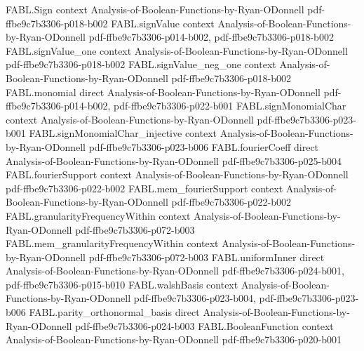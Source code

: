 \begin{theorem}
\label{FABL.coordinateNoisePMF_apply_self'}
\leanok
{}
\proofstep
  {FABL.Sign}
  {context}
  {Analysis-of-Boolean-Functions-by-Ryan-ODonnell}
  {pdf-ffbe9c7b3306-p018-b002}
\proofstep
  {FABL.signValue}
  {context}
  {Analysis-of-Boolean-Functions-by-Ryan-ODonnell}
  {pdf-ffbe9c7b3306-p014-b002,
    pdf-ffbe9c7b3306-p018-b002}
\proofstep
  {FABL.signValue_one}
  {context}
  {Analysis-of-Boolean-Functions-by-Ryan-ODonnell}
  {pdf-ffbe9c7b3306-p018-b002}
\proofstep
  {FABL.signValue_neg_one}
  {context}
  {Analysis-of-Boolean-Functions-by-Ryan-ODonnell}
  {pdf-ffbe9c7b3306-p018-b002}
\proofstep
  {FABL.monomial}
  {direct}
  {Analysis-of-Boolean-Functions-by-Ryan-ODonnell}
  {pdf-ffbe9c7b3306-p014-b002,
    pdf-ffbe9c7b3306-p022-b001}
\proofstep
  {FABL.signMonomialChar}
  {context}
  {Analysis-of-Boolean-Functions-by-Ryan-ODonnell}
  {pdf-ffbe9c7b3306-p023-b001}
\proofstep
  {FABL.signMonomialChar_injective}
  {context}
  {Analysis-of-Boolean-Functions-by-Ryan-ODonnell}
  {pdf-ffbe9c7b3306-p023-b006}
\proofstep
  {FABL.fourierCoeff}
  {direct}
  {Analysis-of-Boolean-Functions-by-Ryan-ODonnell}
  {pdf-ffbe9c7b3306-p025-b004}
\proofstep
  {FABL.fourierSupport}
  {context}
  {Analysis-of-Boolean-Functions-by-Ryan-ODonnell}
  {pdf-ffbe9c7b3306-p022-b002}
\proofstep
  {FABL.mem_fourierSupport}
  {context}
  {Analysis-of-Boolean-Functions-by-Ryan-ODonnell}
  {pdf-ffbe9c7b3306-p022-b002}
\proofstep
  {FABL.granularityFrequencyWithin}
  {context}
  {Analysis-of-Boolean-Functions-by-Ryan-ODonnell}
  {pdf-ffbe9c7b3306-p072-b003}
\proofstep
  {FABL.mem_granularityFrequencyWithin}
  {context}
  {Analysis-of-Boolean-Functions-by-Ryan-ODonnell}
  {pdf-ffbe9c7b3306-p072-b003}
\proofstep
  {FABL.uniformInner}
  {direct}
  {Analysis-of-Boolean-Functions-by-Ryan-ODonnell}
  {pdf-ffbe9c7b3306-p024-b001,
    pdf-ffbe9c7b3306-p015-b010}
\proofstep
  {FABL.walshBasis}
  {context}
  {Analysis-of-Boolean-Functions-by-Ryan-ODonnell}
  {pdf-ffbe9c7b3306-p023-b004,
    pdf-ffbe9c7b3306-p023-b006}
\proofstep
  {FABL.parity_orthonormal_basis}
  {direct}
  {Analysis-of-Boolean-Functions-by-Ryan-ODonnell}
  {pdf-ffbe9c7b3306-p024-b003}
\proofstep
  {FABL.BooleanFunction}
  {context}
  {Analysis-of-Boolean-Functions-by-Ryan-ODonnell}
  {pdf-ffbe9c7b3306-p020-b001}

\end{theorem}
